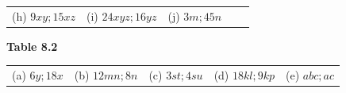{{\begin{center}
\begin{tabular}[t]{|l|l|l|l|l|}
        (h) $9xy;15xz$\hspace{5ex} &
        (i) $24xyz;16yz$\hspace{5ex} &
        (j) $3m;45n$%
     \tabularnewline\cline{1-1}\cline{2-2}\cline{3-3}\cline{4-4}\cline{5-5}
    \end{tabular}
      \end{center}
    \begin{center}{\small\bfseries Table 8.2}\end{center}
          }{ %
        \begin{center}
      \label{m39383*id268893}
    \noindent
      \tablelasttail{}
      \begin{xtabular}[t]{|l|l|l|l|l|}\hline
        (a) $6y;18x$ &
        (b) $12mn;8n$ &
        (c) $3st;4su$ &
        (d) $18kl;9kp$ &
        (e) $abc;ac$%

\end{xtabular}
\end{center}}}
